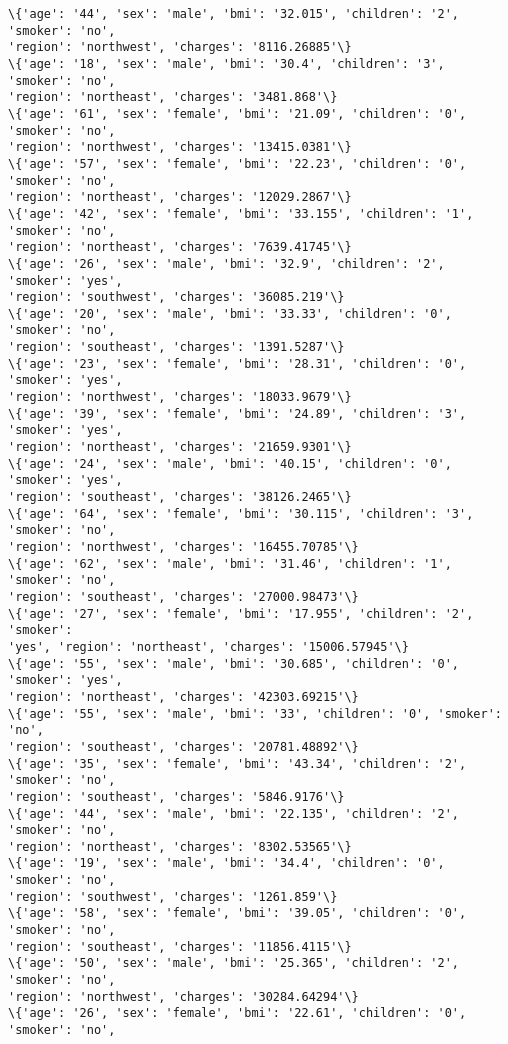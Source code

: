 \documentclass[11pt]{article}
\begin{document}
\begin{Verbatim}[commandchars=\\\{\}]
\{'age': '44', 'sex': 'male', 'bmi': '32.015', 'children': '2', 'smoker': 'no',
'region': 'northwest', 'charges': '8116.26885'\}
\{'age': '18', 'sex': 'male', 'bmi': '30.4', 'children': '3', 'smoker': 'no',
'region': 'northeast', 'charges': '3481.868'\}
\{'age': '61', 'sex': 'female', 'bmi': '21.09', 'children': '0', 'smoker': 'no',
'region': 'northwest', 'charges': '13415.0381'\}
\{'age': '57', 'sex': 'female', 'bmi': '22.23', 'children': '0', 'smoker': 'no',
'region': 'northeast', 'charges': '12029.2867'\}
\{'age': '42', 'sex': 'female', 'bmi': '33.155', 'children': '1', 'smoker': 'no',
'region': 'northeast', 'charges': '7639.41745'\}
\{'age': '26', 'sex': 'male', 'bmi': '32.9', 'children': '2', 'smoker': 'yes',
'region': 'southwest', 'charges': '36085.219'\}
\{'age': '20', 'sex': 'male', 'bmi': '33.33', 'children': '0', 'smoker': 'no',
'region': 'southeast', 'charges': '1391.5287'\}
\{'age': '23', 'sex': 'female', 'bmi': '28.31', 'children': '0', 'smoker': 'yes',
'region': 'northwest', 'charges': '18033.9679'\}
\{'age': '39', 'sex': 'female', 'bmi': '24.89', 'children': '3', 'smoker': 'yes',
'region': 'northeast', 'charges': '21659.9301'\}
\{'age': '24', 'sex': 'male', 'bmi': '40.15', 'children': '0', 'smoker': 'yes',
'region': 'southeast', 'charges': '38126.2465'\}
\{'age': '64', 'sex': 'female', 'bmi': '30.115', 'children': '3', 'smoker': 'no',
'region': 'northwest', 'charges': '16455.70785'\}
\{'age': '62', 'sex': 'male', 'bmi': '31.46', 'children': '1', 'smoker': 'no',
'region': 'southeast', 'charges': '27000.98473'\}
\{'age': '27', 'sex': 'female', 'bmi': '17.955', 'children': '2', 'smoker':
'yes', 'region': 'northeast', 'charges': '15006.57945'\}
\{'age': '55', 'sex': 'male', 'bmi': '30.685', 'children': '0', 'smoker': 'yes',
'region': 'northeast', 'charges': '42303.69215'\}
\{'age': '55', 'sex': 'male', 'bmi': '33', 'children': '0', 'smoker': 'no',
'region': 'southeast', 'charges': '20781.48892'\}
\{'age': '35', 'sex': 'female', 'bmi': '43.34', 'children': '2', 'smoker': 'no',
'region': 'southeast', 'charges': '5846.9176'\}
\{'age': '44', 'sex': 'male', 'bmi': '22.135', 'children': '2', 'smoker': 'no',
'region': 'northeast', 'charges': '8302.53565'\}
\{'age': '19', 'sex': 'male', 'bmi': '34.4', 'children': '0', 'smoker': 'no',
'region': 'southwest', 'charges': '1261.859'\}
\{'age': '58', 'sex': 'female', 'bmi': '39.05', 'children': '0', 'smoker': 'no',
'region': 'southeast', 'charges': '11856.4115'\}
\{'age': '50', 'sex': 'male', 'bmi': '25.365', 'children': '2', 'smoker': 'no',
'region': 'northwest', 'charges': '30284.64294'\}
\{'age': '26', 'sex': 'female', 'bmi': '22.61', 'children': '0', 'smoker': 'no',

\end{Verbatim}
\end{document}
